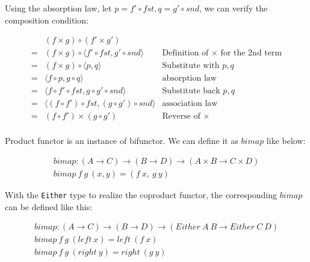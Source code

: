 \documentclass[b5paper]{article}
\begin{document}
\begin{mdframed}
Using the absorption law, let $p = f' \circ fst, q = g' \circ snd$, we can verify the composition condition:

\[
\begin{array}{cll}
  & (f \times g) \circ (f' \times g') & \\
= & (f \times g) \circ \langle f' \circ fst, g' \circ snd \rangle & \text{Definition of $\times$ for the 2nd term} \\
= & (f \times g) \circ \langle p, q \rangle & \text{Substitute with $p, q$} \\
= & \langle f \circ p, g \circ q \rangle & \text{absorption law} \\
= & \langle f \circ f' \circ fst, g \circ g' \circ snd \rangle & \text{Substitute back $p, q$} \\
= & \langle (f \circ f') \circ fst, (g \circ g') \circ snd \rangle & \text{association law} \\
= & (f \circ f') \times (g \circ g') & \text{Reverse of $\times$} \\
\end{array}
\]

\end{mdframed}

Product functor is an instance of bifunctor. We can define it as $bimap$ like below:

\[
\begin{array}{l}
bimap : (A \to C) \to (B \to D) \to (A \times B \to C \times D) \\
bimap\ f\ g\ (x, y) = (f\ x,\ g\ y)
\end{array}
\]

With the \texttt{Either} type to realize the coproduct functor, the corresponding $bimap$ can be defined like this:

\[
\begin{array}{l}
bimap : (A \to C) \to (B \to D) \to (Either\ A\ B \to Either\ C\ D) \\
bimap\ f\ g\ (left\ x) = left\ (f\ x) \\
bimap\ f\ g\ (right\ y) = right\ (g\ y)
\end{array}
\]

\begin{Exercise}\label{ex:product-coproduct}
\end{Exercise}
\end{document}
